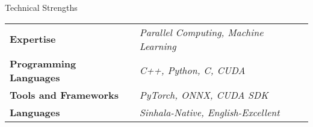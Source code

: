 \documentclass[
	11pt, %
]{./../assets/resume} %
\begin{document}
	




\begin{rSection}{Technical Strengths}

	\def\arraystretch{1.5}

	\begin{tabular}{ l l}
		\textbf{Expertise} & \emph{Parallel Computing, Machine Learning} \\
		\textbf{Programming Languages} & \emph{C++, Python, C, CUDA} \\
		\textbf{Tools and Frameworks} & \emph{PyTorch, ONNX, CUDA SDK} \\ 
		\textbf{Languages} & \emph{Sinhala-Native, English-Excellent} \\
	\end{tabular}

\end{rSection}

\end{document}
